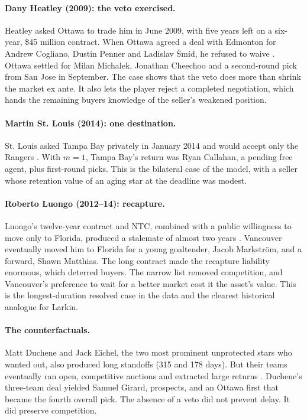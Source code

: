 \paragraph{Dany Heatley (2009): the veto exercised.} Heatley asked Ottawa to trade him in June 2009, with five years left on a six-year, \$45 million contract. When Ottawa agreed a deal with Edmonton for Andrew Cogliano, Dustin Penner and Ladislav \v{S}m\'{i}d, he refused to waive \citep{heatley_thn}. Ottawa settled for Milan Michalek, Jonathan Cheechoo and a second-round pick from San Jose in September. The case shows that the veto does more than shrink the market ex ante. It also lets the player reject a completed negotiation, which hands the remaining buyers knowledge of the seller's weakened position.

\paragraph{Martin St. Louis (2014): one destination.} St. Louis asked Tampa Bay privately in January 2014 and would accept only the Rangers \citep{stlouis_cbs}. With $m=1$, Tampa Bay's return was Ryan Callahan, a pending free agent, plus first-round picks. This is the bilateral case of the model, with a seller whose retention value of an aging star at the deadline was modest.

\paragraph{Roberto Luongo (2012--14): recapture.} Luongo's twelve-year contract and NTC, combined with a public willingness to move only to Florida, produced a stalemate of almost two years \citep{luongo_nesn}. Vancouver eventually moved him to Florida for a young goaltender, Jacob Markstr\"om, and a forward, Shawn Matthias. The long contract made the recapture liability enormous, which deterred buyers. The narrow list removed competition, and Vancouver's preference to wait for a better market cost it the asset's value. This is the longest-duration resolved case in the data and the clearest historical analogue for Larkin.

\paragraph{The counterfactuals.} Matt Duchene and Jack Eichel, the two most prominent unprotected stars who wanted out, also produced long standoffs (315 and 178 days). But their teams eventually ran open, competitive auctions and extracted large returns \citep{eichel_ap}. Duchene's three-team deal yielded Samuel Girard, prospects, and an Ottawa first that became the fourth overall pick. The absence of a veto did not prevent delay. It did preserve competition.
